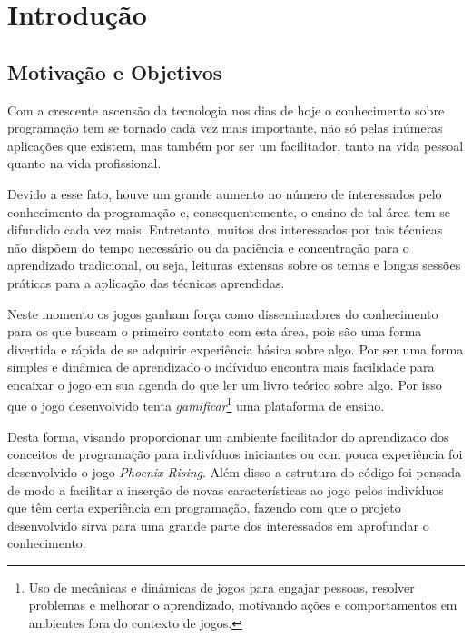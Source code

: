 \chapter{Introdução}
\label{cap:introducao}

\section{Motivação e Objetivos}

Com a crescente ascensão da tecnologia nos dias de hoje o conhecimento sobre
programação tem se tornado cada vez mais importante, não só pelas inúmeras
aplicações que existem, mas também por ser um facilitador, tanto na vida
pessoal quanto na vida profissional.

Devido a esse fato, houve um grande aumento no número de interessados pelo
conhecimento da programação e, consequentemente, o ensino de tal área tem se
difundido cada vez mais. Entretanto, muitos dos interessados por tais técnicas
não dispõem do tempo necessário ou da paciência e concentração para o 
aprendizado tradicional, ou seja, leituras extensas sobre os temas e longas 
sessões práticas para a aplicação das técnicas aprendidas.

Neste momento os jogos ganham força como disseminadores do conhecimento para os 
que buscam o primeiro contato com esta área, pois são
uma forma divertida e rápida de se adquirir experiência básica sobre algo.
Por ser uma forma simples e dinâmica de aprendizado o indíviduo encontra mais
facilidade para encaixar o jogo em sua agenda do que ler um livro teórico sobre
algo. Por isso que o jogo desenvolvido tenta \textit{gamificar}\footnote{Uso de 
mecânicas e dinâmicas de jogos para engajar pessoas, resolver problemas e 
melhorar o aprendizado, motivando ações e comportamentos em ambientes fora do 
contexto de jogos.} uma plataforma de ensino.

Desta forma, visando proporcionar um ambiente facilitador do aprendizado dos
conceitos de programação para indivíduos iniciantes ou com pouca experiência
foi desenvolvido o jogo \textit{Phoenix Rising}. Além disso a estrutura do 
código foi pensada de modo a facilitar a inserção de novas características ao 
jogo pelos indivíduos que têm certa experiência em programação, fazendo com que
o projeto desenvolvido sirva para uma grande parte dos interessados em 
aprofundar o conhecimento.



